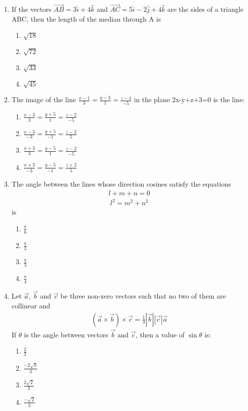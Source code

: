 \begin{enumerate}[label=\arabic*.,ref=\thesubsection.\theenumi]
\item If the vectors $\overrightarrow{AB}=3\hat{i}+4\hat{k}$ and $\overrightarrow{AC}=5\hat{i}-2\hat{j}+4\hat{k}$ are the sides of a triangle ABC, then the length of the median through A is
\begin{enumerate}
\item $\sqrt{18}$
\item $\sqrt{72}$
\item $\sqrt{33}$
\item $\sqrt{45}$
\end{enumerate}

\item The image of the line $\frac{x-1}{3}=\frac{y-3}{1}=\frac{z-4}{-5}$ in the plane 2x-y+z+3=0 is the line:
\begin{enumerate}
\item $\frac{x-3}{3}=\frac{y+5}{1}=\frac{z-2}{-5}$
\item $\frac{x-3}{-3}=\frac{y+5}{-1}=\frac{z-2}{5}$
\item $\frac{x+3}{3}=\frac{y-5}{1}=\frac{z-2}{-5}$
\item $\frac{x+3}{-3}=\frac{y-5}{-1}=\frac{z+2}{5}$ 
\end{enumerate}

\item The angle between the lines whose direction cosines satisfy the equations
\begin{align*}
l+m+n=0
\end{align*}
\begin{align*}
l^2=m^2+n^2
\end{align*}
is
\begin{enumerate}
\item $\frac{\pi}{6}$
\item $\frac{\pi}{2}$
\item $\frac{\pi}{3}$
\item $\frac{\pi}{4}$
\end{enumerate}

\item Let $\overrightarrow{a}$, $\overrightarrow{b}$ and $\overrightarrow{c}$ be three non-zero vectors such that no two of them are collinear and 
\begin{align*}
(\overrightarrow{a} \times \overrightarrow{b}) \times \overrightarrow{c}=\frac{1}{3}|\overrightarrow{b}||\overrightarrow{c}|\overrightarrow{a}
\end{align*}
If $\theta$ is the angle between vectors $\overrightarrow{b}$ and $\overrightarrow{c}$, then a value of $\sin\theta$ is:
\begin{enumerate}
\item $\frac{2}{3}$
\item $\frac{-2\sqrt{3}}{3}$
\item $\frac{2\sqrt{2}}{3}$
\item $\frac{-\sqrt{2}}{3}$
\end{enumerate}


\end{enumerate}
